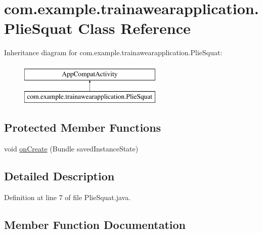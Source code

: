 \hypertarget{classcom_1_1example_1_1trainawearapplication_1_1_plie_squat}{}\section{com.\+example.\+trainawearapplication.\+Plie\+Squat Class Reference}
\label{classcom_1_1example_1_1trainawearapplication_1_1_plie_squat}
Inheritance diagram for com.\+example.\+trainawearapplication.\+Plie\+Squat\+:\begin{figure}[H]
\begin{center}
\leavevmode
\includegraphics[height=2.000000cm]{classcom_1_1example_1_1trainawearapplication_1_1_plie_squat}
\end{center}
\end{figure}
\subsection*{Protected Member Functions}
\begin{DoxyCompactItemize}
\item 
void \mbox{\hyperlink{classcom_1_1example_1_1trainawearapplication_1_1_plie_squat_a3125f76f7d64ff641f8f07e2b8d5c3a7}{on\+Create}} (Bundle saved\+Instance\+State)
\end{DoxyCompactItemize}


\subsection{Detailed Description}


Definition at line 7 of file Plie\+Squat.\+java.



\subsection{Member Function Documentation}
\mbox{\label{classcom_1_1example_1_1trainawearapplication_1_1_plie_squat_a3125f76f7d64ff641f8f07e2b8d5c3a7}} 
